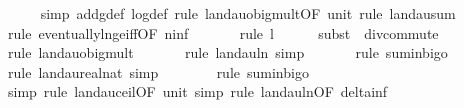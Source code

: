 \begin{isabellebody}
\ \ \ \ \isamarkupfalse%
\ {\isacharparenleft}{\kern0pt}simp\ add{\isacharcolon}{\kern0pt}g{\isacharunderscore}{\kern0pt}def\ log{\isacharunderscore}{\kern0pt}def{\isacharcomma}{\kern0pt}\ rule\ landau{\isacharunderscore}{\kern0pt}o{\isachardot}{\kern0pt}big{\isacharunderscore}{\kern0pt}mult{\isacharunderscore}{\kern0pt}{}{\isacharprime}{\kern0pt}{\isacharbrackleft}{\kern0pt}OF\ unit{\isacharunderscore}{\kern0pt}{}{\isacharbrackright}{\kern0pt}{\isacharcomma}{\kern0pt}\ rule\ landau{\isacharunderscore}{\kern0pt}sum{\isacharunderscore}{\kern0pt}{}{\isacharparenright}{\kern0pt}\isanewline
\ \ \ \ \ \ \isamarkupfalse%
\ {\isacharparenleft}{\kern0pt}rule\ eventually{\isacharunderscore}{\kern0pt}ln{\isacharunderscore}{\kern0pt}ge{\isacharunderscore}{\kern0pt}iff{\isacharbrackleft}{\kern0pt}OF\ n{\isacharunderscore}{\kern0pt}inf{\isacharbrackright}{\kern0pt}{\isacharparenright}{\kern0pt}\isanewline
\ \ \ \ \ \isamarkupfalse%
\ {\isacharparenleft}{\kern0pt}rule\ l{}{\isacharparenright}{\kern0pt}\isanewline
\ \ \ \ \isamarkupfalse%
\ {\isacharparenleft}{\kern0pt}subst\ {\isacharparenleft}{\kern0pt}{}{\isacharparenright}{\kern0pt}\ div{\isacharunderscore}{\kern0pt}commute{\isacharparenright}{\kern0pt}\isanewline
\ \ \ \ \isamarkupfalse%
\ {\isacharparenleft}{\kern0pt}rule\ landau{\isacharunderscore}{\kern0pt}o{\isachardot}{\kern0pt}big{\isacharunderscore}{\kern0pt}mult{\isacharunderscore}{\kern0pt}{}{\isacharparenright}{\kern0pt}\isanewline
\ \ \ \ \ \isamarkupfalse%
\ {\isacharparenleft}{\kern0pt}rule\ landau{\isacharunderscore}{\kern0pt}ln{\isacharunderscore}{\kern0pt}{}{\isacharcomma}{\kern0pt}\ simp{\isacharparenright}{\kern0pt}\isanewline
\ \ \ \ \ \isamarkupfalse%
\ {\isacharparenleft}{\kern0pt}rule\ sum{\isacharunderscore}{\kern0pt}in{\isacharunderscore}{\kern0pt}bigo{\isacharparenright}{\kern0pt}\isanewline
\ \ \ \ \ \ \isamarkupfalse%
\ {\isacharparenleft}{\kern0pt}rule\ landau{\isacharunderscore}{\kern0pt}real{\isacharunderscore}{\kern0pt}nat{\isacharcomma}{\kern0pt}\ simp{\isacharparenright}{\kern0pt}\isanewline
\ \ \ \ \ \ \isamarkupfalse%
\ {\isacharparenleft}{\kern0pt}rule\ sum{\isacharunderscore}{\kern0pt}in{\isacharunderscore}{\kern0pt}bigo{\isacharparenright}{\kern0pt}\isanewline
\ \ \ \ \ \ \ \isamarkupfalse%
\ {\isacharparenleft}{\kern0pt}simp{\isacharcomma}{\kern0pt}\ rule\ landau{\isacharunderscore}{\kern0pt}ceil{\isacharbrackleft}{\kern0pt}OF\ unit{\isacharunderscore}{\kern0pt}{}{\isacharbrackright}{\kern0pt}{\isacharcomma}{\kern0pt}\ simp{\isacharcomma}{\kern0pt}\ rule\ landau{\isacharunderscore}{\kern0pt}ln{\isacharunderscore}{\kern0pt}{}{\isacharbrackleft}{\kern0pt}OF\ delta{\isacharunderscore}{\kern0pt}inf{\isacharbrackright}{\kern0pt}{\isacharparenright}{\kern0pt}\isanewline

\end{isabellebody}
